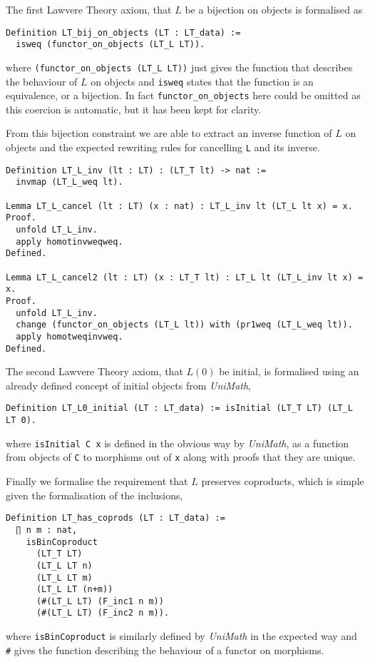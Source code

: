 The first Lawvere Theory axiom, that $L$ be a bijection on objects is formalised
as
\begin{lstlisting}
Definition LT_bij_on_objects (LT : LT_data) := 
  isweq (functor_on_objects (LT_L LT)).
\end{lstlisting}
where \lstinline|(functor_on_objects (LT_L LT))| just gives the function that
describes the behaviour of $L$ on objects and \lstinline|isweq| states that the
function is an equivalence, or a bijection. In fact \lstinline|functor_on_objects|
here could be omitted as this coercion is automatic, but it has been kept for
clarity.

From this bijection constraint we are able to extract an inverse function of $L$
on objects and the expected rewriting rules for cancelling \lstinline|L| and its
inverse.
\begin{lstlisting}
Definition LT_L_inv (lt : LT) : (LT_T lt) -> nat :=
  invmap (LT_L_weq lt).

Lemma LT_L_cancel (lt : LT) (x : nat) : LT_L_inv lt (LT_L lt x) = x.
Proof.
  unfold LT_L_inv.
  apply homotinvweqweq.
Defined.
  
Lemma LT_L_cancel2 (lt : LT) (x : LT_T lt) : LT_L lt (LT_L_inv lt x) = x.
Proof.
  unfold LT_L_inv.
  change (functor_on_objects (LT_L lt)) with (pr1weq (LT_L_weq lt)).
  apply homotweqinvweq.
Defined.
\end{lstlisting}

The second Lawvere Theory axiom, that $L(0)$ be initial, is formalised using an
already defined concept of initial objects from \textit{UniMath},
\begin{lstlisting}
Definition LT_L0_initial (LT : LT_data) := isInitial (LT_T LT) (LT_L LT 0).
\end{lstlisting}
where \lstinline|isInitial C x| is defined in the obvious way by
\textit{UniMath}, as a function from objects of \lstinline|C| to morphisms out
of \lstinline|x| along with proofs that they are unique.

Finally we formalise the requirement that $L$ preserves coproducts, which is
simple given the formalisation of the inclusions,
\begin{lstlisting}
Definition LT_has_coprods (LT : LT_data) := 
  ∏ n m : nat, 
    isBinCoproduct 
      (LT_T LT)
      (LT_L LT n)
      (LT_L LT m)
      (LT_L LT (n+m))
      (#(LT_L LT) (F_inc1 n m)) 
      (#(LT_L LT) (F_inc2 n m)).
\end{lstlisting}
where \lstinline|isBinCoproduct| is similarly defined by \textit{UniMath} in the
expected way and \lstinline|#| gives the function describing the behaviour of a
functor on morphisms.

